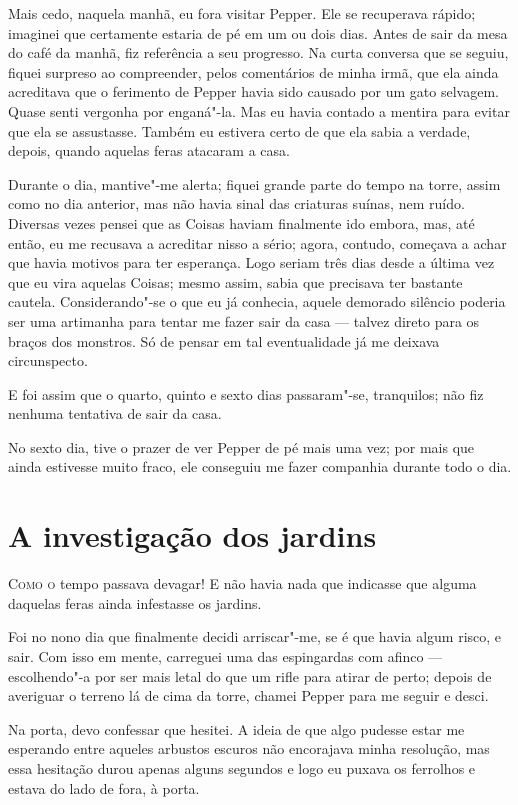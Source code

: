 Mais cedo, naquela manhã, eu fora visitar Pepper. Ele se recuperava rápido; imaginei que certamente estaria de pé em um
ou dois dias. Antes de sair da mesa do café da manhã, fiz referência a seu progresso. Na curta conversa que se seguiu,
fiquei surpreso ao compreender, pelos comentários de minha irmã, que ela ainda acreditava que o ferimento de Pepper
havia sido causado por um gato selvagem. Quase senti vergonha por enganá"-la. Mas eu havia contado a mentira para evitar
que ela se assustasse. Também eu estivera certo de que ela sabia a verdade, depois, quando aquelas feras atacaram a
casa.

Durante o dia, mantive"-me alerta; fiquei grande parte do tempo na torre, assim como no dia anterior, mas não havia
sinal das criaturas suínas, nem ruído. Diversas vezes pensei que as Coisas haviam finalmente ido embora, mas, até
então, eu me recusava a acreditar nisso a sério; agora, contudo, começava a achar que havia motivos para ter esperança.
Logo seriam três dias desde a última vez que eu vira aquelas Coisas; mesmo assim, sabia que precisava ter bastante
cautela. Considerando"-se o que eu já conhecia, aquele demorado silêncio poderia ser uma artimanha para tentar me fazer
sair da casa --- talvez direto para os braços dos monstros. Só de pensar em tal eventualidade já me deixava circunspecto.

E foi assim que o quarto, quinto e sexto dias passaram"-se, tranquilos; não fiz nenhuma tentativa de sair da casa.

No sexto dia, tive o prazer de ver Pepper de pé mais uma vez; por mais que ainda estivesse muito fraco, ele conseguiu
me fazer companhia durante todo o dia.


\clearpage

\chapter{A investigação dos jardins}

\textsc{Como o} tempo passava devagar! E não havia nada que indicasse que alguma daquelas feras ainda infestasse os jardins.

Foi no nono dia que finalmente decidi arriscar"-me, se é que havia algum risco, e sair. Com isso em mente, carreguei uma
das espingardas com afinco --- escolhendo"-a por ser mais letal do que um rifle para atirar de perto; depois de
averiguar o terreno lá de cima da torre, chamei Pepper para me seguir e desci. 

Na porta, devo confessar que hesitei. A ideia de que algo pudesse estar me esperando entre aqueles arbustos escuros não
encorajava minha resolução, mas essa hesitação durou apenas alguns segundos e logo eu puxava os ferrolhos e estava do
lado de fora, à porta.

